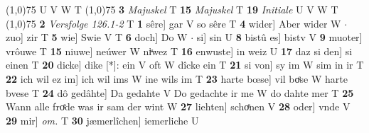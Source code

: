 \documentclass[8pt,a4paper,notitlepage]{article}
\begin{document}
\begin{table}[ht]
\begin{minipage}[t]{0.5\linewidth}
\scriptsize
\line(1,0){75} \newline
U V W T \newline
\line(1,0){75} \newline
\textbf{3} \textit{Majuskel} T  \textbf{15} \textit{Majuskel} T  \textbf{19} \textit{Initiale} U V W T  \newline
\line(1,0){75} \newline
\textbf{2} \textit{Versfolge 126.1-2} T  \textbf{1} sêre] gar V so sêre T \textbf{4} wider] Aber wider W  $\cdot$ zuo] zir T \textbf{5} wie] Swie V T \textbf{6} doch] Do W  $\cdot$ si] sin U \textbf{8} bistû es] bistv V \textbf{9} muoter] vrôuwe T \textbf{15} niuwe] neúwer W niͮwez T \textbf{16} enwuste] in weiz U \textbf{17} daz si den] si einen T \textbf{20} dicke] dike [*]: ein V oft W dîcke ein T \textbf{21} si von] sy im W sim in ir T \textbf{22} ich wil ez im] ich wil ims W ine wils im T \textbf{23} harte bœse] vil boͤse W harte bvese T \textbf{24} dô gedâhte] Da gedahte V Do gedachte ir me W do dahte mer T \textbf{25} Wann alle froͤde was ir sam der wint W \textbf{27} liehten] schoͤnen V \textbf{28} oder] vnde V \textbf{29} mir] \textit{om.} T \textbf{30} jæmerlîchen] iemerliche U \newline
\end{minipage}
\end{table}
\end{document}
